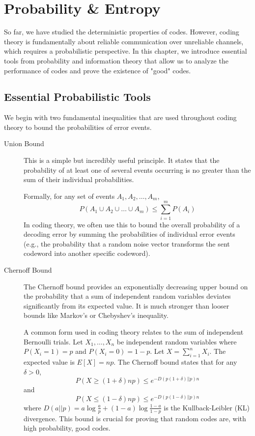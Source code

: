 
\section{Probability \& Entropy}

So far, we have studied the deterministic properties of codes. However, coding theory is fundamentally about reliable communication over unreliable channels, which requires a probabilistic perspective. In this chapter, we introduce essential tools from probability and information theory that allow us to analyze the performance of codes and prove the existence of "good" codes.

\subsection{Essential Probabilistic Tools}

We begin with two fundamental inequalities that are used throughout coding theory to bound the probabilities of error events.

\begin{description}
    \item[Union Bound] This is a simple but incredibly useful principle. It states that the probability of at least one of several events occurring is no greater than the sum of their individual probabilities.

    Formally, for any set of events $A_1, A_2, \dots, A_m$,
    \[
        P(A_1 \cup A_2 \cup \dots \cup A_m) \le \sum_{i=1}^m P(A_i)
    \]
    In coding theory, we often use this to bound the overall probability of a decoding error by summing the probabilities of individual error events (e.g., the probability that a random noise vector transforms the sent codeword into another specific codeword).

    \item[Chernoff Bound] The Chernoff bound provides an exponentially decreasing upper bound on the probability that a sum of independent random variables deviates significantly from its expected value. It is much stronger than looser bounds like Markov's or Chebyshev's inequality.

    A common form used in coding theory relates to the sum of independent Bernoulli trials. Let $X_1, \dots, X_n$ be independent random variables where $P(X_i=1) = p$ and $P(X_i=0) = 1-p$. Let $X = \sum_{i=1}^n X_i$. The expected value is $E[X] = np$. The Chernoff bound states that for any $\delta > 0$,
    \[
        P(X \ge (1+\delta)np) \le e^{-D(p(1+\delta) || p)n}
    \]
    and
    \[
        P(X \le (1-\delta)np) \le e^{-D(p(1-\delta) || p)n}
    \]
    where $D(a || p) = a \log\frac{a}{p} + (1-a)\log\frac{1-a}{1-p}$ is the Kullback-Leibler (KL) divergence. This bound is crucial for proving that random codes are, with high probability, good codes.
\end{description}

